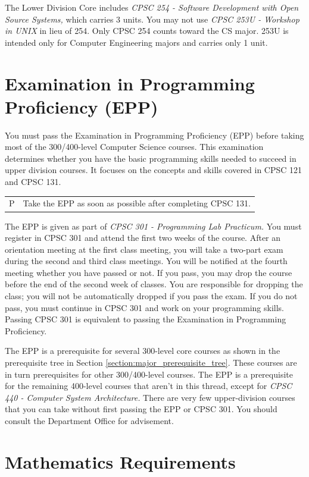 \documentclass{book}
\newenvironment{tip}{
  \tcolorbox \begin{tabular}{m{.5in} m{5in}} \Large{P} &
}{
  \end{tabular} \endtcolorbox
}
\begin{document}
The Lower Division Core includes \emph{CPSC 254 - Software Development with Open Source Systems,} which carries 3 units. You may not use \emph{CPSC 253U - Workshop in UNIX} in lieu of 254. Only CPSC 254 counts toward the CS major. 253U is intended only for Computer Engineering majors and carries only 1 unit.

\section{Examination in Programming Proficiency (EPP)}
You must pass the Examination in Programming Proficiency (EPP) before taking most of the 300/400-level Computer Science courses. This examination determines whether you have the basic programming skills needed to succeed in upper division courses. It focuses on the concepts and skills covered in CPSC 121 and CPSC 131.

\begin{tip}
  Take the EPP as soon as possible after completing CPSC 131.
  \end{tip}

The EPP is given as part of \emph{CPSC 301 - Programming Lab Practicum.} You must register in CPSC 301 and attend the first two weeks of the course. After an orientation meeting at the first class meeting, you will take a two-part exam during the second and third class meetings. You will be notified at the fourth meeting whether you have passed or not. If you pass, you may drop the course before the end of the second week of classes. You are responsible for dropping the class; you will not be automatically dropped if you pass the exam. If you do not pass, you must continue in CPSC 301 and work on your programming skills. Passing CPSC 301 is equivalent to passing the Examination in Programming Proficiency.

The EPP is a prerequisite for several 300-level core courses as shown in the prerequisite tree in Section \ref{section:major_prerequisite_tree}. These courses are in turn prerequisites for other 300/400-level courses. The EPP is a prerequisite for the remaining 400-level courses that aren’t in this thread, except for \emph{CPSC 440 - Computer System Architecture.} There are very few upper-division courses that you can take without first passing the EPP or CPSC 301. You should consult the Department Office for advisement.

\section{Mathematics Requirements}
\end{document}

